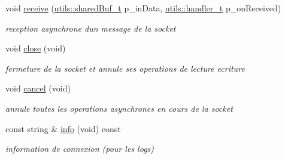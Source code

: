 \begin{DoxyCompactItemize}
void \hyperlink{classxtd_1_1network_1_1base_1_1Connection_a09146c9c2dbf1ad85867fd0afab15c0c}{receive} (\hyperlink{namespacextd_1_1network_1_1utils_a92b366b7e2a1ab09ac4f4a0401f8fb84}{utils\+::shared\+Buf\+\_\+t} p\+\_\+in\+Data, \hyperlink{namespacextd_1_1network_1_1utils_ac8a6f796cd645f83cde023d163665bb5}{utils\+::handler\+\_\+t} p\+\_\+on\+Received)
\begin{DoxyCompactList}\small\item\em reception asynchrone d\textquotesingle{}un message de la socket \end{DoxyCompactList}\item 
void \hyperlink{classxtd_1_1network_1_1base_1_1Connection_a73097d339a3716c05fee7ee19753ee4a}{close} (void)
\begin{DoxyCompactList}\small\item\em fermeture de la socket et annule ses operations de lecture ecriture \end{DoxyCompactList}\item 
void \hyperlink{classxtd_1_1network_1_1base_1_1Connection_a0bde1ab3f89862d0680c820645b7244d}{cancel} (void)
\begin{DoxyCompactList}\small\item\em annule toutes les operations asynchrones en cours de la socket \end{DoxyCompactList}\item 
const string \& \hyperlink{classxtd_1_1network_1_1base_1_1Connection_a6f249c285df79485b06f9c7b6ed03237}{info} (void) const 
\begin{DoxyCompactList}\small\item\em information de connexion (pour les logs) \end{DoxyCompactList}\end{DoxyCompactItemize}

